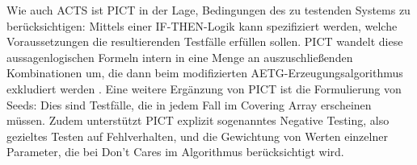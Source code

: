 Wie auch ACTS ist PICT in der Lage, Bedingungen des zu testenden Systems zu berücksichtigen: Mittels einer \glqq IF-THEN\grqq{}-Logik kann spezifiziert werden, welche Voraussetzungen die resultierenden Testfälle erfüllen sollen. PICT wandelt diese aussagenlogischen Formeln intern in eine Menge an auszuschließenden Kombinationen um, die dann beim modifizierten AETG-Erzeugungsalgorithmus exkludiert werden \cite{czerwonka2006pairwise}. Eine weitere Ergänzung von PICT ist die Formulierung von \glqq Seeds\grqq{}: Dies sind Testfälle, die in jedem Fall im Covering Array erscheinen müssen. Zudem unterstützt PICT explizit sogenanntes \glqq Negative Testing\grqq{}, also gezieltes Testen auf Fehlverhalten, und die Gewichtung von Werten einzelner Parameter, die bei Don't Cares im Algorithmus berücksichtigt wird.

